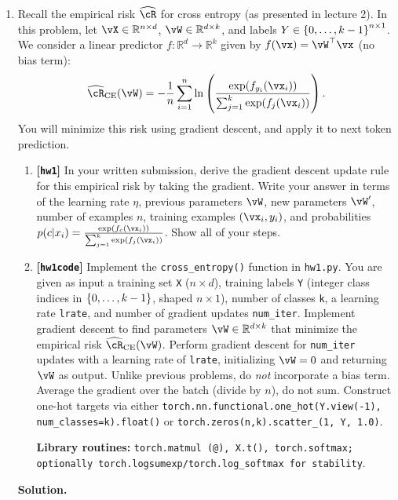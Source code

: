 \documentclass{article}
\def\R{\mathbb{R}}
\def\hcR{\widehat{\cR}}
\def\CE{\text{CE}}
\def\hw{\textbf{[\texttt{hw1}]}\xspace}
\def\hwcode{\textbf{[\texttt{hw1code}]}\xspace}
\theoremstyle{definition}
\theoremstyle{remark}
\newenvironment{Q}
{%
  \clearpage
  \item
  }
  {%
    \phantom{s} %
    \bigskip
    \textbf{Solution.}
  }
\begin{document}
\begin{enumerate}[font={\Large\bfseries},left=0pt]
\begin{Q}
    Recall the empirical risk $\hcR$ for cross entropy (as presented in lecture 2).
    In this problem, let $\vX\in\R^{n\times d}$, $\vW\in\R^{d\times k}$, and labels $Y\in\cbr{0,\ldots,k-1}^{n\times 1}$.
    We consider a linear predictor $f:\R^d\to\R^k$ given by $f(\vx)=\vW^\top\vx$ (no bias term):
    \begin{align*}
    \hcR_{\CE}(\vW) = -\frac{1}{n} \sum_{i=1}^n \ln \left( \frac{\exp( f_{y_i}(\vx_i) )}{\sum_{j=1}^{k} \exp( f_j(\vx_i) )} \right).
    \end{align*}
    You will minimize this risk using gradient descent, and apply it to next token prediction.
    \begin{enumerate}
    \item \hw In your written submission, derive the gradient descent update rule for this empirical risk by taking the gradient.  Write your answer in terms of the learning rate $\eta$, previous parameters $\vW$, new parameters $\vW'$, number of examples $n$, training examples $(\vx_i, y_i)$, and probabilities $p(c|x_i) = \frac{\exp( f_c(\vx_i) )}{\sum_{j=1}^{k} \exp( f_j(\vx_i) )}$.  Show all of your steps.
    \item \hwcode Implement the \texttt{cross\_entropy()} function in \texttt{hw1.py}.
    You are given as input a training set \texttt{X} ($n\times d$), training labels \texttt{Y} (integer class indices in $\cbr{0,\ldots,k-1}$, shaped $n\times 1$),
    number of classes \texttt{k}, a learning rate \texttt{lrate}, and number of gradient updates \texttt{num\_iter}.
    Implement gradient descent to find parameters $\vW\in\R^{d\times k}$ that minimize the empirical risk $\hcR_{\CE}(\vW)$.
    Perform gradient descent for \texttt{num\_iter} updates with a learning rate of \texttt{lrate}, initializing $\vW = 0$ and returning $\vW$ as output.
    Unlike previous problems, do \emph{not} incorporate a bias term. Average the gradient over the batch (divide by $n$), do not sum.
    Construct one-hot targets via either \texttt{torch.nn.functional.one\_hot(Y.view(-1), num\_classes=k).float()} or
    \texttt{torch.zeros(n,k).scatter\_(1, Y, 1.0)}.
    
    \textbf{Library routines:} \texttt{torch.matmul (@), X.t(), torch.softmax;\\
    optionally torch.logsumexp/torch.log\_softmax for stability}.
    

\end{enumerate}
\end{Q}
\end{enumerate}
\end{document}
